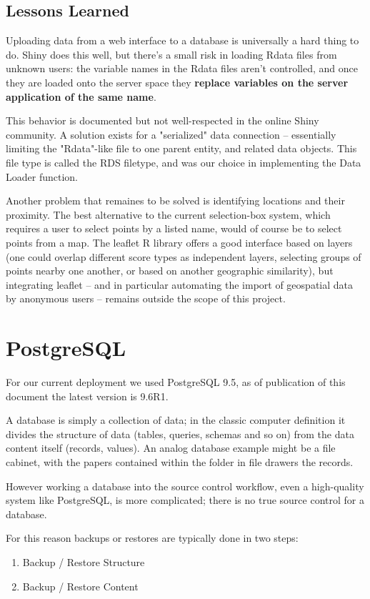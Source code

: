 \documentclass[logos,parttoc,morelanguage=french,morelanguage=german]{orsay-memoire}
\begin{document}
\subsection{Lessons Learned}
Uploading data from a web interface to a database is universally a hard thing to do. Shiny does this well, but there's a small risk in loading Rdata files from unknown users: the variable names in the Rdata files aren't controlled, and once they are loaded onto the server space they \textbf{replace variables on the server application of the same name}.

This behavior is documented but not well-respected in the online Shiny community. A solution exists for a "serialized" data connection -- essentially limiting the "Rdata"-like file to one parent entity, and related data objects. This file type is called the RDS filetype, and was our choice in implementing the Data Loader function.

Another problem that remaines to be solved is identifying locations and their proximity. The best alternative to the current selection-box system, which requires a user to select points by a listed name, would of course be to select points from a map. The leaflet R library offers a good interface based on layers (one could overlap different score types as independent layers, selecting groups of points nearby one another, or based on another geographic similarity), but integrating leaflet -- and in particular automating the import of geospatial data by anonymous users -- remains outside the scope of this project.


\section{PostgreSQL}

For our current deployment we used PostgreSQL 9.5, as of publication of this document the latest version is 9.6R1.

A database is simply a collection of data; in the classic computer definition it divides the structure of data (tables, queries, schemas and so on) from the data content itself (records, values). An analog database example might be a file cabinet, with the papers contained within the folder in file drawers the records.

However working a database into the source control workflow, even a high-quality system like PostgreSQL, is more complicated; there is no true source control for a database.

For this reason backups or restores are typically done in two steps:
\begin{enumerate}
\item Backup / Restore Structure
\item Backup / Restore Content
\end{enumerate}
\end{document}
